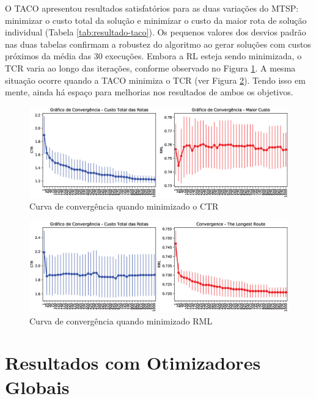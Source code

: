 O TACO apresentou resultados satisfatórios para as duas variações do MTSP: minimizar o custo total da solução e minimizar o custo da maior rota de solução individual (Tabela \ref{tab:resultado-taco}). Os pequenos valores dos desvios padrão nas duas tabelas confirmam a robustez do algoritmo ao gerar soluções com custos próximos da média das 30 execuções. Embora a RL esteja sendo minimizada, o TCR varia ao longo das iterações, conforme observado no Figura \ref{fig:resultados-convergencia-taco-tcr}. A mesma situação ocorre quando a TACO minimiza o TCR (ver Figura \ref{fig:resultados-convergencia-taco-rml}). Tendo isso em mente, ainda há espaço para melhorias nos resultados de ambos os objetivos.

\begin{figure}[htb]
    \centering
    \caption{Curva de convergência quando minimizado o CTR} \label{fig:resultados-convergencia-taco-tcr}
    \includegraphics[width=\textwidth]{imagens/convergence-totalcost-taco.eps}
    \end{figure}

\begin{figure}[htb]
    \centering
    \caption{Curva de convergência quando minimizado RML} \label{fig:resultados-convergencia-taco-rml}
    \includegraphics[width=\textwidth]{imagens/convergence-maxcost-taco.eps}
\end{figure}

\section{Resultados com Otimizadores Globais}
\label{sec-resultados-fss-pso}


